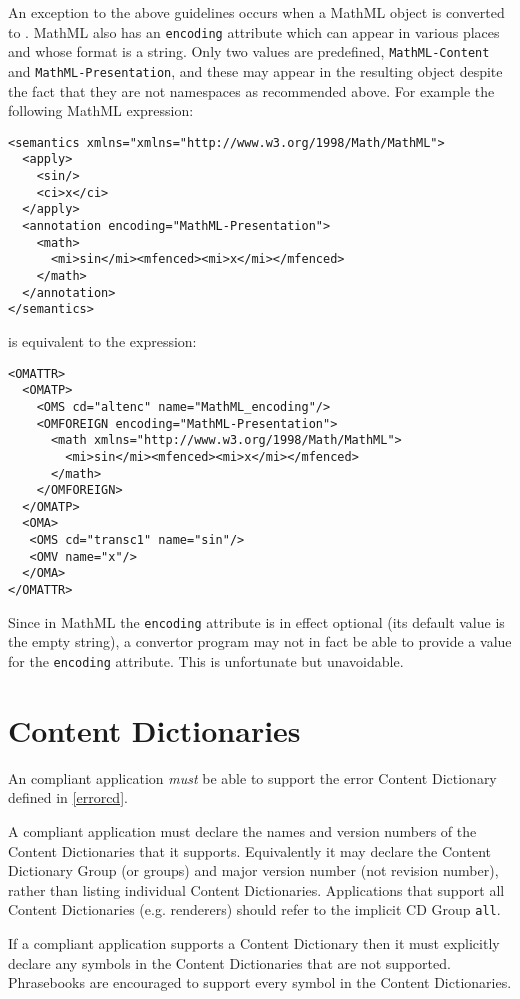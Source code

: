 An exception to the above guidelines occurs when a MathML object is converted to \OM.
MathML also has an \lstinline|encoding| attribute which can appear in various places and
whose format is a string.  Only two values are predefined, \lstinline|MathML-Content| and
\lstinline|MathML-Presentation|, and these may appear in the resulting \OM object despite
the fact that they are not namespaces as recommended above. For example the following
MathML expression:
\begin{lstlisting}
<semantics xmlns="xmlns="http://www.w3.org/1998/Math/MathML">
  <apply>
    <sin/>
    <ci>x</ci>
  </apply>
  <annotation encoding="MathML-Presentation">
    <math>
      <mi>sin</mi><mfenced><mi>x</mi></mfenced>
    </math>
  </annotation>
</semantics>
\end{lstlisting}
is equivalent to the \OM expression:
\begin{lstlisting}
<OMATTR>
  <OMATP>
    <OMS cd="altenc" name="MathML_encoding"/>
    <OMFOREIGN encoding="MathML-Presentation">
      <math xmlns="http://www.w3.org/1998/Math/MathML">
        <mi>sin</mi><mfenced><mi>x</mi></mfenced>
      </math>
    </OMFOREIGN>
  </OMATP>
  <OMA>
   <OMS cd="transc1" name="sin"/>
   <OMV name="x"/>
  </OMA>
</OMATTR>
\end{lstlisting}

Since in MathML the \lstinline|encoding| attribute is in effect optional (its default
value is the empty string), a convertor program may not in fact be able to provide a value
for the \OM \lstinline|encoding| attribute.  This is unfortunate but unavoidable.

\section{Content Dictionaries}\label{sec_compl_cd}

An \OM compliant application \emph{must} be able to support the error Content Dictionary
defined in \ref{errorcd}.


A compliant application must declare the names and version numbers of the Content
Dictionaries that it supports. Equivalently it may declare the Content Dictionary Group
(or groups) and major version number (not revision number), rather than listing individual
Content Dictionaries.  Applications that support all Content Dictionaries (e.g. renderers)
should refer to the implicit CD Group \lstinline|all|.


If a compliant application supports a Content Dictionary then it must explicitly declare
any symbols in the Content Dictionaries that are not supported. Phrasebooks are encouraged
to support every symbol in the Content Dictionaries.


